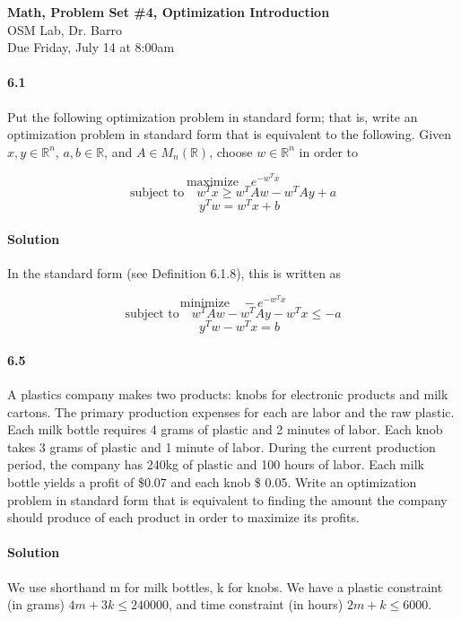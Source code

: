 \documentclass[letterpaper,12pt]{article}
\theoremstyle{definition}
\begin{document}
\begin{flushleft}
   \textbf{\large{Math, Problem Set \#4, Optimization Introduction}} \\[5pt]
   OSM Lab, Dr. Barro\\[5pt]
   Due Friday, July 14 at 8:00am
\end{flushleft}

\vspace{5mm}
   

\paragraph{6.1} Put the following optimization problem in standard form; that is, write an optimization problem in standard form that is equivalent to the following. Given $x, y \in \mathbb{R}^n$, $a, b \in \mathbb{R}$, and $A \in M_n(\mathbb{R})$, choose $w \in \mathbb{R}^n$ in order to

$$ \text{maximize} \quad e^{-w^T x}$$
$$ \text{subject to} \quad w^T x \ge w^T A w - w^T A y + a $$
$$ \quad y^T w = w^T x + b $$

\paragraph{Solution} In the standard form (see Definition 6.1.8), this is written as 


$$ \text{minimize} \quad -e^{-w^T x}$$
$$ \text{subject to} \quad  w^T A w - w^T A y - w^T x  \le -a $$
$$ \quad y^T w - w^T x =  b $$

\paragraph{6.5} A plastics company makes two products: knobs for electronic products and milk cartons. The primary production expenses for each are labor and the raw plastic.
Each milk bottle requires 4 grams of plastic and 2 minutes of labor. Each knob takes 3 grams of plastic and 1 minute of labor. During the current production period, the company has 240kg of plastic and 100 hours of labor. Each milk bottle yields a profit of \$0.07 and each knob \$ 0.05. Write an optimization problem in standard form that is equivalent to finding the amount the company should produce of each product in order to maximize its profits.

\paragraph{Solution} We use shorthand m for milk bottles, k for knobs. We have a plastic constraint (in grams) $4 m + 3 k \le 240000 $, and time constraint (in hours) $2 m + k \le 6000 $.
\end{document}
